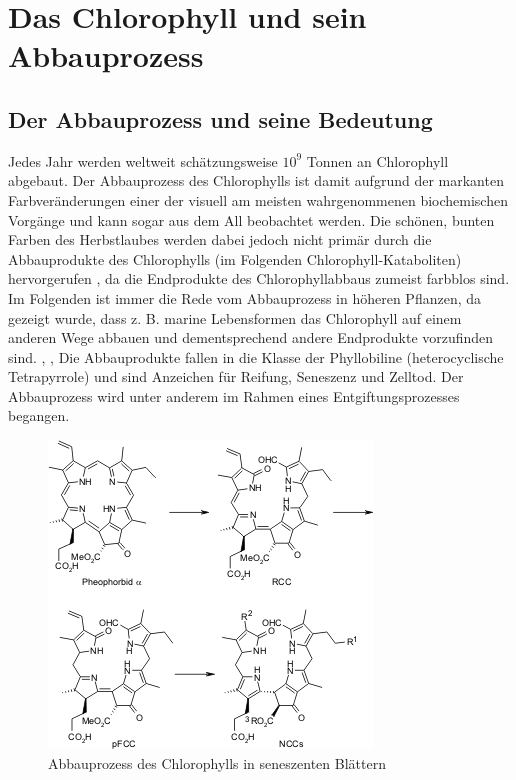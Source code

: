 \chapter{Das Chlorophyll und sein Abbauprozess}

\section{Der Abbauprozess und seine Bedeutung}

Jedes Jahr werden weltweit schätzungsweise $10^{9}$ Tonnen an Chlorophyll abgebaut. Der Abbauprozess des Chlorophylls ist damit aufgrund der markanten Farbveränderungen einer der visuell am meisten wahrgenommenen biochemischen Vorgänge und kann sogar aus dem All beobachtet werden. \cite{ChlorophyllBreakdown} Die schönen, bunten Farben des Herbstlaubes werden dabei jedoch nicht primär durch die Abbauprodukte des Chlorophylls (im Folgenden Chlorophyll-Kataboliten) hervorgerufen  \cite{DegradationChlorophyll}, da die Endprodukte des Chlorophyllabbaus zumeist farbblos sind. \cite{ChlorophyllBreakdown} Im Folgenden ist immer die Rede vom Abbauprozess in höheren Pflanzen, da gezeigt wurde, dass z. B. marine Lebensformen das Chlorophyll auf einem anderen Wege abbauen und dementsprechend andere Endprodukte vorzufinden sind. \cite{ChlorophyllBreakdown}, \cite{ErsterKatabolit}, \cite{ChlorophyllCataboliteDifferent} Die Abbauprodukte fallen in die Klasse der Phyllobiline (heterocyclische Tetrapyrrole) und sind Anzeichen für Reifung, Seneszenz und Zelltod. Der Abbauprozess wird unter anderem im Rahmen eines Entgiftungsprozesses begangen. \cite{ChlorophyllKatabolitenalsZeichenReifung}

\begin{figure}[!hbtp]
  \centering
  \includegraphics[scale=0.5]{figures/Kapitel2/VWA_Schema_Chlorophyllabbau.png}
  \caption[Abbauprozess des Chlorophylls, Quelle: http://www.organische-chemie.ch/chemie/2007nov/antioxidantien.shtm (Zugegriffen am: 05.11.2017)]{Abbauprozess des Chlorophylls in seneszenten Blättern}
  \label{fig:Chlorophyllabbau}
\end{figure}

